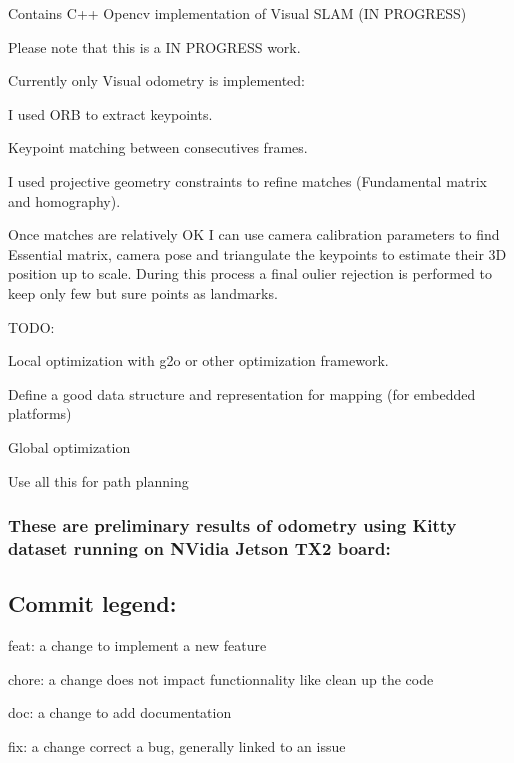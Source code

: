 Contains C++ Opencv implementation of Visual S\+L\+AM (IN P\+R\+O\+G\+R\+E\+SS)

Please note that this is a IN P\+R\+O\+G\+R\+E\+SS work.

Currently only Visual odometry is implemented\+:
\begin{DoxyItemize}
\item I used O\+RB to extract keypoints.
\item Keypoint matching between consecutives frames.
\item I used projective geometry constraints to refine matches (Fundamental matrix and homography).
\item Once matches are relatively OK I can use camera calibration parameters to find Essential matrix, camera pose and triangulate the keypoints to estimate their 3D position up to scale. During this process a final oulier rejection is performed to keep only few but sure points as landmarks.
\end{DoxyItemize}

T\+O\+DO\+:
\begin{DoxyItemize}
\item Local optimization with g2o or other optimization framework.
\item Define a good data structure and representation for mapping (for embedded platforms)
\item Global optimization
\item Use all this for path planning
\end{DoxyItemize}

\subsubsection*{These are preliminary results of odometry using Kitty dataset running on N\+Vidia Jetson T\+X2 board\+:}



\subsection*{Commit legend\+:}

feat\+: a change to implement a new feature

chore\+: a change does not impact functionnality like clean up the code

doc\+: a change to add documentation

fix\+: a change correct a bug, generally linked to an issue 